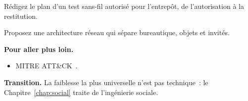 \begin{boxexo}[title={\ding{45}\quad Exercice~18.9. Plan \niveauexpert}]
Rédigez le plan d'un test sans-fil autorisé pour l'entrepôt, de
l'autorisation à la restitution.
\end{boxexo}

\begin{boxexo}[title={\ding{45}\quad Exercice~18.10. Architecture \niveauexpert}]
Proposez une architecture réseau qui sépare bureautique, objets et invités.
\end{boxexo}

\bigskip

\begin{boxinfo}
\textbf{Pour aller plus loin.}
\begin{itemize}
    \item MITRE ATT\&CK~\cite{mitreattack}.
\end{itemize}
\end{boxinfo}

\begin{boxinfo}
\textbf{Transition.} La faiblesse la plus universelle n'est pas technique~:
le Chapitre~\ref{chap:social} traite de l'ingénierie sociale.
\end{boxinfo}
